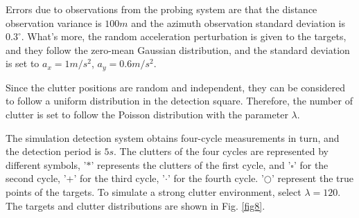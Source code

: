 \documentclass[default,iicol]{sn-jnl}%
\theoremstyle{thmstyleone}%
\theoremstyle{thmstyletwo}%
\theoremstyle{thmstylethree}%
\begin{document}
\begin{table}[h]
    \vspace{-0.3cm}
    \begin{center}
        \begin{minipage}{\columnwidth}
            \caption{ Multi-objective motion information}\label{tab1}%

        \end{minipage}
    \end{center}
\end{table}
\vspace{-0.3cm}

\noindent
Errors due to observations from the probing system are that the distance observation variance is $100 m$ and the azimuth observation standard deviation is $0.3  ^ {\circ}$. What's more, the random acceleration perturbation is given to the targets, and they follow the zero-mean Gaussian distribution, and the standard deviation is set to $a_{x}\!=\!1m/s^2$, $a_{y}\!=\!0.6m/s^2$.

Since the clutter positions are random and independent, they can be considered to follow a uniform distribution in the detection square. Therefore, the number of clutter is set to follow the Poisson distribution with the parameter $\lambda$.

The simulation detection system obtains four-cycle measurements in turn, and the detection period is $5s$. The clutters of the four cycles are represented by different symbols, '$\ast$' represents the clutters of the first cycle, and '$\square$' for the second cycle, '+' for the third cycle, '$\cdot$' for the fourth cycle. '$\bigcirc$' represent the true points of the targets. To simulate a strong clutter environment, select $\lambda \!=\!120$. The targets and clutter distributions are shown in Fig. \ref{fig8}.
\end{document}
